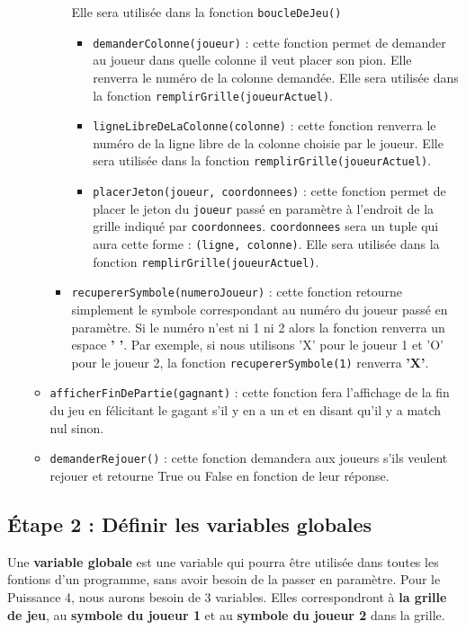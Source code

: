 \documentclass[11pt]{article}
\begin{document}
\begin{itemize}
\begin{itemize}
\begin{itemize}
Elle sera utilisée dans la fonction \texttt{boucleDeJeu()}
\begin{itemize}
\item \texttt{demanderColonne(joueur)} : cette fonction permet de demander au joueur dans quelle colonne il veut placer son pion. Elle renverra le numéro de la colonne demandée. Elle sera utilisée dans la fonction \texttt{remplirGrille(joueurActuel)}.
\item \texttt{ligneLibreDeLaColonne(colonne)} : cette fonction renverra le numéro de la ligne libre de la colonne choisie par le joueur. Elle sera utilisée dans la fonction \texttt{remplirGrille(joueurActuel)}.
\item \texttt{placerJeton(joueur, coordonnees)} : cette fonction permet de placer le jeton du \texttt{joueur} passé en paramètre à l'endroit de la grille indiqué par \texttt{coordonnees}. \texttt{coordonnees} sera un tuple qui aura cette forme : \texttt{(ligne, colonne)}. Elle sera utilisée dans la fonction \texttt{remplirGrille(joueurActuel)}.
\end{itemize}
\item \texttt{recupererSymbole(numeroJoueur)} : cette fonction retourne simplement le symbole correspondant au numéro du joueur passé en paramètre. Si le numéro n'est ni 1 ni 2 alors la fonction renverra un espace \textbf{' '}. Par exemple, si nous utilisons 'X' pour le joueur 1 et 'O' pour le joueur 2, la fonction \texttt{recupererSymbole(1)} renverra \textbf{'X'}.
\end{itemize}
\item \texttt{afficherFinDePartie(gagnant)} : cette fonction fera l'affichage de la fin du jeu en félicitant le gagant s'il y en a un et en disant qu'il y a match nul sinon.
\item \texttt{demanderRejouer()} : cette fonction demandera aux joueurs s'ils veulent rejouer et retourne True ou False en fonction de leur réponse.
\end{itemize}
\end{itemize}

\subsection*{Étape 2 : Définir les variables globales}
\label{puissance4_etape2}
Une \textbf{variable globale} est une variable qui pourra être utilisée dans toutes les fontions d'un programme, sans avoir besoin de la passer en paramètre. Pour le Puissance 4, nous aurons besoin de 3 variables. Elles correspondront à \textbf{la grille de jeu}, au \textbf{symbole du joueur 1} et au \textbf{symbole du joueur 2} dans la grille.
\end{document}
